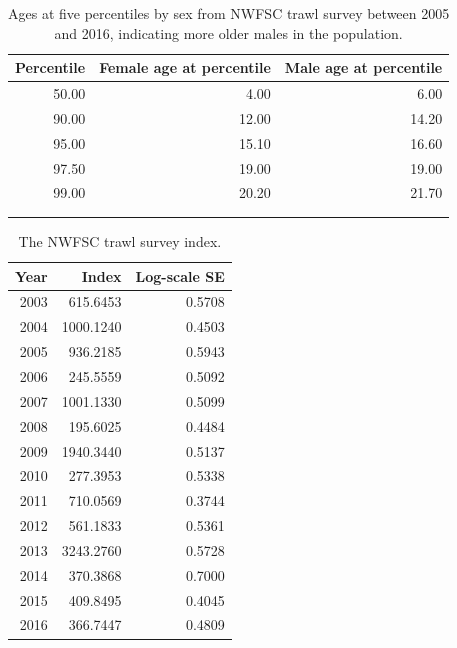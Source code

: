 \documentclass[12pt,]{article}
\begin{document}
\begin{table}[ht]
\centering
\caption{Ages at five percentiles by sex from 
                                          NWFSC trawl survey between 2005 and 2016, 
                                          indicating more older males in the population.} 
\label{tab:Fleet8_NWFSCTrawl_agepercents}
\begin{tabular}{rrr}
  \hline
Percentile & Female age at percentile & Male age at percentile \\ 
  \hline
50.00 & 4.00 & 6.00 \\ 
  90.00 & 12.00 & 14.20 \\ 
  95.00 & 15.10 & 16.60 \\ 
  97.50 & 19.00 & 19.00 \\ 
  99.00 & 20.20 & 21.70 \\ 
   &  &  \\ 
   &  &  \\ 
   \hline
\end{tabular}
\end{table}\begin{table}[ht]
\centering
\caption{The NWFSC trawl survey
                                            index.} 
\label{tab:Fleet8_NWFSCTrawl_index}
\begin{tabular}{rrr}
  \hline
Year & Index & Log-scale SE \\ 
  \hline
 2003 & 615.6453 & 0.5708 \\ 
   2004 & 1000.1240 & 0.4503 \\ 
   2005 & 936.2185 & 0.5943 \\ 
   2006 & 245.5559 & 0.5092 \\ 
   2007 & 1001.1330 & 0.5099 \\ 
   2008 & 195.6025 & 0.4484 \\ 
   2009 & 1940.3440 & 0.5137 \\ 
   2010 & 277.3953 & 0.5338 \\ 
   2011 & 710.0569 & 0.3744 \\ 
   2012 & 561.1833 & 0.5361 \\ 
   2013 & 3243.2760 & 0.5728 \\ 
   2014 & 370.3868 & 0.7000 \\ 
   2015 & 409.8495 & 0.4045 \\ 
   2016 & 366.7447 & 0.4809 \\ 
   \hline
\end{tabular}
\end{table}

\FloatBarrier
\end{document}
